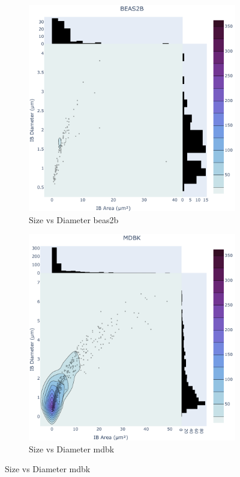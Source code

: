 \begin{figure}
    \medskip
    \begin{subfigure}{0.5\textwidth}
        \includegraphics[width=\textwidth]{09. Chapter 4/Figs/01. Localisation introduction/04. heatmap_beas2b.pdf} 
        \caption[]{Size vs Diameter beas2b}
    \end{subfigure}
    \hfill
    \begin{subfigure}{0.5\textwidth}
        \includegraphics[width=\textwidth]{09. Chapter 4/Figs/01. Localisation introduction/05. heatmap_mdbk.pdf} 
        \caption[]{Size vs Diameter mdbk}
    \end{subfigure}
    

\end{figure}
